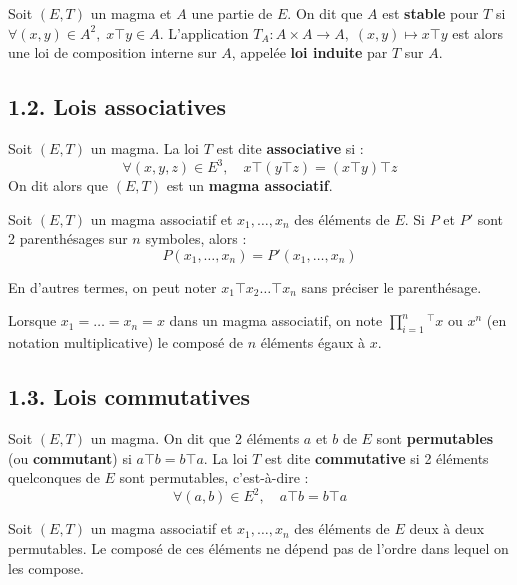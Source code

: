 \documentclass[a4paper,11pt]{article}
\newcommand{\mot}[1]{\textcolor{bordeaux}{\textbf{#1}}}
\begin{document}
\begin{definition}
Soit $(E, T)$ un magma et $A$ une partie de $E$. On dit que $A$ est \mot{stable} pour $T$ si $\forall (x,y) \in A^2, \; x \top y \in A$.
L'application $T_A : A \times A \to A, \; (x,y) \mapsto x \top y$ est alors une loi de composition interne sur $A$, appelée \mot{loi induite} par $T$ sur $A$.
\end{definition}

\subsection{1.2. Lois associatives}

\begin{definition}
Soit $(E, T)$ un magma. La loi $T$ est dite \mot{associative} si :
\[
\forall (x, y, z) \in E^3, \quad x \top (y \top z) = (x \top y) \top z
\]
On dit alors que $(E, T)$ est un \mot{magma associatif}.
\end{definition}

\begin{proposition}
Soit $(E, T)$ un magma associatif et $x_1, \dots, x_n$ des éléments de $E$. Si $P$ et $P'$ sont 2 parenthésages sur $n$ symboles, alors :
\[
P(x_1, \dots, x_n) = P'(x_1, \dots, x_n)
\]
\end{proposition}

En d'autres termes, on peut noter $x_1 \top x_2 \dots \top x_n$ sans préciser le parenthésage.

\begin{notation}
Lorsque $x_1 = \dots = x_n = x$ dans un magma associatif, on note $\prod_{i=1}^n^\top x$ ou $x^n$ (en notation multiplicative) le composé de $n$ éléments égaux à $x$.
\end{notation}

\subsection{1.3. Lois commutatives}

\begin{definition}
Soit $(E, T)$ un magma. On dit que 2 éléments $a$ et $b$ de $E$ sont \mot{permutables} (ou \mot{commutant}) si $a \top b = b \top a$.
La loi $T$ est dite \mot{commutative} si 2 éléments quelconques de $E$ sont permutables, c'est-à-dire :
\[
\forall (a, b) \in E^2, \quad a \top b = b \top a
\]
\end{definition}

\begin{proposition}
Soit $(E, T)$ un magma associatif et $x_1, \dots, x_n$ des éléments de $E$ deux à deux permutables. Le composé de ces éléments ne dépend pas de l'ordre dans lequel on les compose.
\end{proposition}
\end{document}
